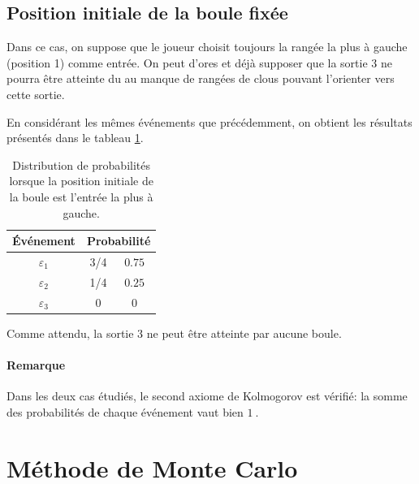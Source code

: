 \documentclass[a4paper, 12pt]{article}
\begin{document}
    \subsection{Position initiale de la boule fixée}
    Dans ce cas, on suppose que le joueur choisit toujours la rangée la plus à gauche (position 1) comme entrée. On peut d'ores et déjà supposer que la sortie 3 ne pourra être atteinte du au manque de rangées de clous pouvant l'orienter vers cette sortie.\par
    
    En considérant les mêmes événements que précédemment, on obtient les résultats présentés dans le tableau \ref{table:tab_Q1b}.\par
    \begin{table}[!h]
        \centering
        \begin{tabular}{|c|c|c|}
            \hline
            \textbf{Événement} & \multicolumn{2}{c|}{\textbf{Probabilité}}\\
            \hline
            \hline
            \(\varepsilon_1\) & 3/4 & \(\SI{0.75}{}\)\\
            \hline
            \(\varepsilon_2\) & 1/4 & \(\SI{0.25}{}\)\\
            \hline
            \(\varepsilon_3\) & 0 & \(\SI{0}{}\)\\
            \hline
        \end{tabular}
        \caption{Distribution de probabilités lorsque la position initiale de la boule est l'entrée la plus à gauche.}
        \label{table:tab_Q1b}
    \end{table}
    Comme attendu, la sortie 3 ne peut être atteinte par aucune boule.
	\paragraph{Remarque} Dans les deux cas étudiés, le second axiome de Kolmogorov est vérifié: la somme des probabilités de chaque événement vaut bien \(\SI{1}{}\).
	\section{Méthode de Monte Carlo}
\end{document}
